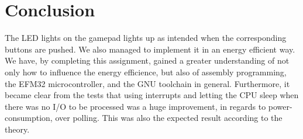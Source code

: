\section{Conclusion}

The LED lights on the gamepad lights up as intended when the corresponding buttons are pushed. We also managed to implement it in an energy efficient way. We have, by completing this assignment, gained a greater understanding of not only how to influence the energy efficience, but also of assembly programming, the EFM32 microcontroller, and the GNU toolchain in general. Furthermore, it became clear from the tests that using interrupts and letting the CPU sleep when there was no I/O to be processed was a huge improvement, in regards to power-consumption, over polling. This was also the expected result according to the theory.
